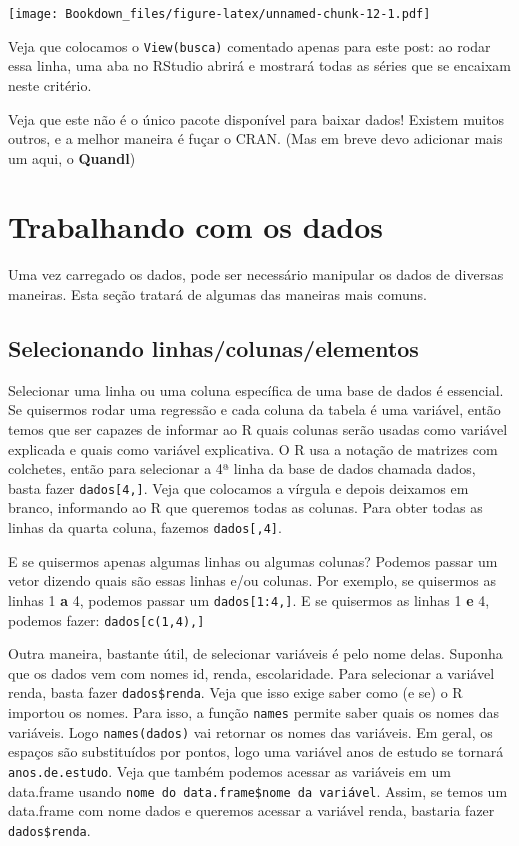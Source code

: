 \documentclass[
]{book}
\begin{document}
\texttt{[image: Bookdown\_files/figure-latex/unnamed-chunk-12-1.pdf]}

Veja que colocamos o \texttt{View(busca)} comentado apenas para este post: ao rodar essa linha, uma aba no RStudio abrirá e mostrará todas as séries que se encaixam neste critério.

Veja que este não é o único pacote disponível para baixar dados! Existem muitos outros, e a melhor maneira é fuçar o CRAN. (Mas em breve devo adicionar mais um aqui, o \textbf{Quandl})

\hypertarget{trabalhando-com-os-dados}{%
\section{Trabalhando com os dados}\label{trabalhando-com-os-dados}}

Uma vez carregado os dados, pode ser necessário manipular os dados de diversas maneiras. Esta seção tratará de algumas das maneiras mais comuns.

\hypertarget{selecionando-linhascolunaselementos}{%
\subsection{Selecionando linhas/colunas/elementos}\label{selecionando-linhascolunaselementos}}

Selecionar uma linha ou uma coluna específica de uma base de dados é essencial. Se quisermos rodar uma regressão e cada coluna da tabela é uma variável, então temos que ser capazes de informar ao R quais colunas serão usadas como variável explicada e quais como variável explicativa. O R usa a notação de matrizes com colchetes, então para selecionar a 4ª linha da base de dados chamada dados, basta fazer \texttt{dados{[}4,{]}}. Veja que colocamos a vírgula e depois deixamos em branco, informando ao R que queremos todas as colunas. Para obter todas as linhas da quarta coluna, fazemos \texttt{dados{[},4{]}}.

E se quisermos apenas algumas linhas ou algumas colunas? Podemos passar um vetor dizendo quais são essas linhas e/ou colunas. Por exemplo, se quisermos as linhas 1 \textbf{a} 4, podemos passar um \texttt{dados{[}1:4,{]}}. E se quisermos as linhas 1 \textbf{e} 4, podemos fazer: \texttt{dados{[}c(1,4),{]}}

Outra maneira, bastante útil, de selecionar variáveis é pelo nome delas. Suponha que os dados vem com nomes id, renda, escolaridade. Para selecionar a variável renda, basta fazer \texttt{dados\$renda}. Veja que isso exige saber como (e se) o R importou os nomes. Para isso, a função \texttt{names} permite saber quais os nomes das variáveis. Logo \texttt{names(dados)} vai retornar os nomes das variáveis. Em geral, os espaços são substituídos por pontos, logo uma variável anos de estudo se tornará \texttt{anos.de.estudo}. Veja que também podemos acessar as variáveis em um data.frame usando \texttt{nome\ do\ data.frame\$nome\ da\ variável}. Assim, se temos um data.frame com nome dados e queremos acessar a variável renda, bastaria fazer \texttt{dados\$renda}.
\end{document}
